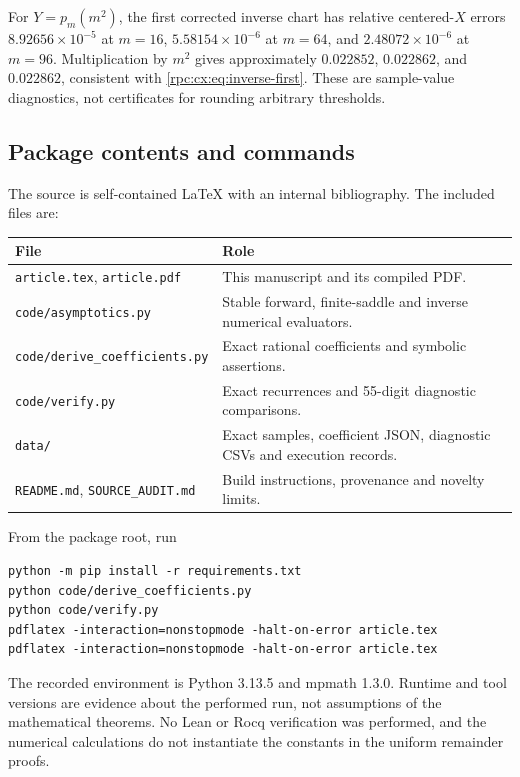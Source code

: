 \documentclass[11pt]{article}
\theoremstyle{definition}
\theoremstyle{remark}
\numberwithin{equation}{section}
\begin{document}
For $Y=p_m(m^2)$, the first corrected inverse chart has relative
centered-$X$ errors $8.92656\times10^{-5}$ at $m=16$,
$5.58154\times10^{-6}$ at $m=64$, and
$2.48072\times10^{-6}$ at $m=96$.
Multiplication by $m^2$ gives approximately $0.022852$,
$0.022862$, and $0.022862$, consistent with
\eqref{rpc:cx:eq:inverse-first}. These are sample-value diagnostics, not
certificates for rounding arbitrary thresholds.

\subsection{Package contents and commands}
The source is self-contained LaTeX with an internal bibliography.
The included files are:
\begin{center}\small
\begin{tabular}{p{}p{}}
\toprule
File & Role\\
\midrule
\texttt{article.tex}, \texttt{article.pdf} & This manuscript and its compiled PDF.\\
\texttt{code/asymptotics.py} & Stable forward, finite-saddle and inverse numerical evaluators.\\
\texttt{code/derive\_coefficients.py} & Exact rational coefficients and symbolic assertions.\\
\texttt{code/verify.py} & Exact recurrences and 55-digit diagnostic comparisons.\\
\texttt{data/} & Exact samples, coefficient JSON, diagnostic CSVs and execution records.\\
\texttt{README.md}, \texttt{SOURCE\_AUDIT.md} & Build instructions, provenance and novelty limits.\\
\bottomrule
\end{tabular}
\end{center}
From the package root, run
\begin{verbatim}
python -m pip install -r requirements.txt
python code/derive_coefficients.py
python code/verify.py
pdflatex -interaction=nonstopmode -halt-on-error article.tex
pdflatex -interaction=nonstopmode -halt-on-error article.tex
\end{verbatim}
The recorded environment is Python 3.13.5 and mpmath 1.3.0.
Runtime and tool versions are evidence about the performed run, not
assumptions of the mathematical theorems. No Lean or Rocq verification
was performed, and the numerical calculations do not instantiate the
constants in the uniform remainder proofs.
\end{document}
